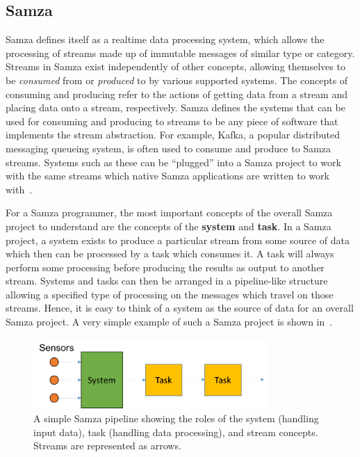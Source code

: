 \subsection{Samza} %
\label{ssub:impl_samza}

Samza defines itself as a realtime data processing system, which allows the processing of streams made up of immutable
messages of similar type or category. Streams in Samza exist independently of other concepts, allowing themselves to be
\textit{consumed} from or \textit{produced} to by various supported systems. The concepts of consuming and producing refer
to the actions of getting data from a stream and placing data onto a stream, respectively. Samza defines the systems that can be used
for consuming and producing to streams to be any piece of software that implements the stream abstraction. For example,
Kafka, a popular distributed messaging queueing system, is often used to consume and produce to Samza streams. Systems such as these can be
``plugged'' into a Samza project to work with the same streams which native Samza applications are written to work with~\cite{Samza:doc}.

For a Samza programmer, the most important concepts of the overall Samza project to understand are the concepts of the
\textbf{system} and \textbf{task}. In a Samza project, a system exists to produce a particular stream from some source
of data which then can
be processed by a task which consumes it. A task will always perform some processing before producing the results as output to another stream. Systems and tasks
can then be arranged in a pipeline-like structure allowing a specified type of processing on the messages which travel
on those streams. Hence, it is easy to think of a system as the source of data for an overall Samza project. A very
simple example of such a Samza project is shown in~.

\begin{figure}[ht]
  \centering
  \includegraphics[width=0.8\textwidth]{includes/figures/fig_samza_overview}
  \caption{A simple Samza pipeline showing the roles of the system (handling input data), task (handling data processing), and stream concepts. Streams are represented
  as arrows.}
  \label{fig:samza_overview}
\end{figure}

